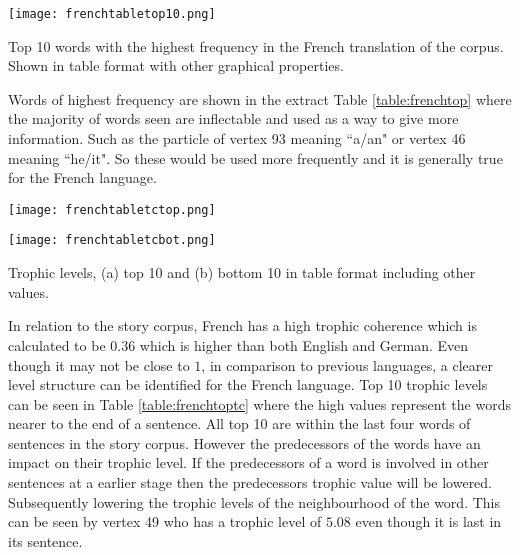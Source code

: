 \begin{table}[!htb]
\centering
\texttt{[image: frenchtabletop10.png]}
\caption{Top 10 words with the highest frequency in the French translation of the corpus. Shown in table format with other graphical properties. }
\label{table:frenchtop}
\end{table}

Words of highest frequency are shown in the extract Table \ref{table:frenchtop} where the majority of words seen are inflectable and used as a way to give more information. Such as the particle of vertex 93 meaning ``a/an" or vertex 46 meaning ``he/it". So these would be used more frequently and it is generally true for the French language.

\begin{table}[!htb]
\centering
\begin{subtable}{.45\textwidth}
	\centering
	\texttt{[image: frenchtabletctop.png]}
	\caption{}
	\label{table:frenchtoptc}
\end{subtable}
\hfill
\begin{subtable}{.45\textwidth}
	\centering
	\texttt{[image: frenchtabletcbot.png]}
	\caption{}
	\label{table:frenchbottc}
\end{subtable}
\caption{Trophic levels, (a) top 10 and (b) bottom 10 in table format including other values.}
\end{table}

In relation to the story corpus, French has a high trophic coherence which is calculated to be $0.36$ which is higher than both English and German. Even though it may not be close to $1$, in comparison to previous languages, a clearer level structure can be identified for the French language. Top 10 trophic levels can be seen in Table \ref{table:frenchtoptc} where the high values represent the words nearer to the end of a sentence. All top 10 are within the last four words of sentences in the story corpus. However the predecessors of the words have an impact on their trophic level. If the predecessors of a word is involved in other sentences at a earlier stage then the predecessors trophic value will be lowered. Subsequently lowering the trophic levels of the neighbourhood of the word. This can be seen by vertex 49 who has a trophic level of $5.08$ even though it is last in its sentence.

